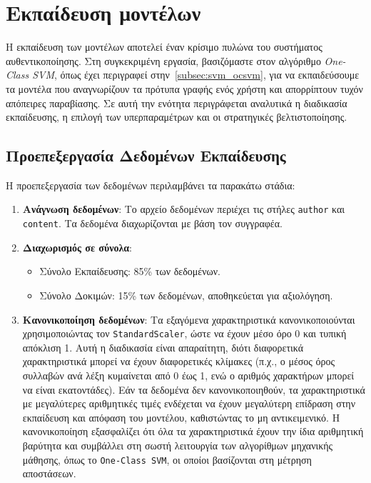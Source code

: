 \section{Εκπαίδευση μοντέλων}
\label{sec:implementation_train}

Η εκπαίδευση των μοντέλων αποτελεί έναν κρίσιμο πυλώνα του συστήματος αυθεντικοποίησης. Στη συγκεκριμένη εργασία, βασιζόμαστε στον αλγόριθμο \textit{One-Class SVM}, όπως έχει περιγραφεί στην~\autoref{subsec:svm_ocsvm}, για να εκπαιδεύσουμε τα μοντέλα που αναγνωρίζουν τα πρότυπα γραφής ενός χρήστη και απορρίπτουν τυχόν απόπειρες παραβίασης. Σε αυτή την ενότητα περιγράφεται αναλυτικά η διαδικασία εκπαίδευσης, η επιλογή των υπερπαραμέτρων και οι στρατηγικές βελτιστοποίησης.

\subsection{Προεπεξεργασία Δεδομένων Εκπαίδευσης}

Η προεπεξεργασία των δεδομένων περιλαμβάνει τα παρακάτω στάδια:
\begin{enumerate}
    \item \textbf{Ανάγνωση δεδομένων}: Το αρχείο δεδομένων περιέχει τις στήλες \texttt{author} και \texttt{content}. Τα δεδομένα διαχωρίζονται με βάση τον συγγραφέα.
    \item \textbf{Διαχωρισμός σε σύνολα}:
    \begin{itemize}
        \item Σύνολο Εκπαίδευσης: 85\% των δεδομένων.
        \item Σύνολο Δοκιμών: 15\% των δεδομένων, αποθηκεύεται για αξιολόγηση.
    \end{itemize}
    \item \textbf{Κανονικοποίηση δεδομένων}: Τα εξαγόμενα χαρακτηριστικά κανονικοποιούνται χρησιμοποιώντας τον \texttt{StandardScaler}, ώστε να έχουν μέσο όρο 0 και τυπική απόκλιση 1. Αυτή η διαδικασία είναι απαραίτητη, διότι διαφορετικά χαρακτηριστικά μπορεί να έχουν διαφορετικές κλίμακες (π.χ., ο μέσος όρος συλλαβών ανά λέξη κυμαίνεται από 0 έως 1, ενώ ο αριθμός χαρακτήρων μπορεί να είναι εκατοντάδες). Εάν τα δεδομένα δεν κανονικοποιηθούν, τα χαρακτηριστικά με μεγαλύτερες αριθμητικές τιμές ενδέχεται να έχουν μεγαλύτερη επίδραση στην εκπαίδευση και απόφαση του μοντέλου, καθιστώντας το μη αντικειμενικό. Η κανονικοποίηση εξασφαλίζει ότι όλα τα χαρακτηριστικά έχουν την ίδια αριθμητική βαρύτητα και συμβάλλει στη σωστή λειτουργία των αλγορίθμων μηχανικής μάθησης, όπως το \texttt{One-Class SVM}, οι οποίοι βασίζονται στη μέτρηση αποστάσεων.
\end{enumerate}

